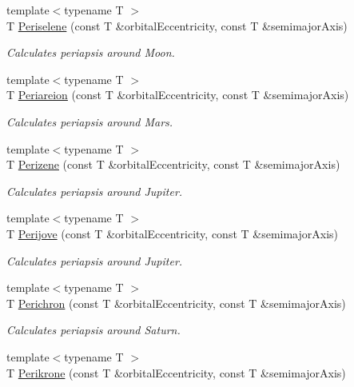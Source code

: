 \begin{DoxyCompactItemize}
{\footnotesize template$<$typename T $>$ }\\T \mbox{\hyperlink{group___e_g_x_phys-_periapsis_ga255874374dde571531e443cdbef9ef0c}{Periselene}} (const T \&orbital\+Eccentricity, const T \&semimajor\+Axis)
\begin{DoxyCompactList}\small\item\em Calculates periapsis around Moon. \end{DoxyCompactList}\item 
{\footnotesize template$<$typename T $>$ }\\T \mbox{\hyperlink{group___e_g_x_phys-_periapsis_ga0617ba07a30b0fd0544c02f691bfae26}{Periareion}} (const T \&orbital\+Eccentricity, const T \&semimajor\+Axis)
\begin{DoxyCompactList}\small\item\em Calculates periapsis around Mars. \end{DoxyCompactList}\item 
{\footnotesize template$<$typename T $>$ }\\T \mbox{\hyperlink{group___e_g_x_phys-_periapsis_ga0523c65b7fc26e675388b2c3d38aa00b}{Perizene}} (const T \&orbital\+Eccentricity, const T \&semimajor\+Axis)
\begin{DoxyCompactList}\small\item\em Calculates periapsis around Jupiter. \end{DoxyCompactList}\item 
{\footnotesize template$<$typename T $>$ }\\T \mbox{\hyperlink{group___e_g_x_phys-_periapsis_ga075052f7ff9aa1d5fdf4501b493be86b}{Perijove}} (const T \&orbital\+Eccentricity, const T \&semimajor\+Axis)
\begin{DoxyCompactList}\small\item\em Calculates periapsis around Jupiter. \end{DoxyCompactList}\item 
{\footnotesize template$<$typename T $>$ }\\T \mbox{\hyperlink{group___e_g_x_phys-_periapsis_ga12b5e99aa2e3e7031ef6ce93060cf516}{Perichron}} (const T \&orbital\+Eccentricity, const T \&semimajor\+Axis)
\begin{DoxyCompactList}\small\item\em Calculates periapsis around Saturn. \end{DoxyCompactList}\item 
{\footnotesize template$<$typename T $>$ }\\T \mbox{\hyperlink{group___e_g_x_phys-_periapsis_gaa56f74c44a3583b8f0d13b821c1d7422}{Perikrone}} (const T \&orbital\+Eccentricity, const T \&semimajor\+Axis)

\end{DoxyCompactItemize}
